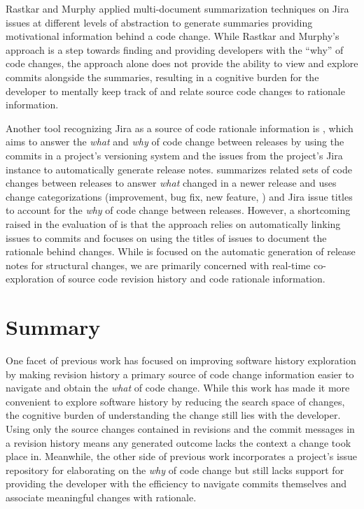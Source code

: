Rastkar and Murphy \cite{rastkar_why_2013} applied multi-document summarization techniques on Jira issues 
at different levels of abstraction to generate summaries providing motivational information behind a code change.
While Rastkar and Murphy's approach is a step towards finding and providing developers with the ``why'' of code changes, 
the approach alone does not provide the ability to view and explore commits alongside the summaries,
resulting in a cognitive burden for the developer to mentally 
keep track of and relate source code changes to rationale information.

Another tool recognizing Jira as a source of code rationale information is  \cite{moreno_arena_2017}, 
which aims to answer the \emph{what} and \emph{why} of code change between releases by 
using the commits in a project's versioning system and the issues from the project's Jira instance 
to automatically generate release notes. 
 summarizes related sets of code changes between releases to answer \emph{what} 
changed in a newer release and uses change categorizations (\eg improvement, bug fix, new feature, \etc) 
and Jira issue titles to account for the \emph{why} of code change between releases.
However, a shortcoming raised in the evaluation of  is that the approach 
relies on automatically linking issues to commits and focuses on 
using the titles of issues to document the rationale behind changes.
While  is focused on the automatic generation of release notes for structural changes,
we are primarily concerned with real-time co-exploration of source code revision history 
and code rationale information.


\section{Summary}

One facet of previous work has focused on improving software history exploration by making revision history 
a primary source of code change information easier to navigate and obtain the \emph{what} of code change.
While this work has made it more convenient to explore software history by reducing the search space of changes, 
the cognitive burden of understanding the change still lies with the developer.
Using only the source changes contained in revisions and the commit messages in a revision history 
means any generated outcome lacks the context a change took place in.
Meanwhile, the other side of previous work incorporates a project's issue repository for elaborating 
on the \emph{why} of code change but still lacks support for providing the developer with the efficiency to 
navigate commits themselves and associate meaningful changes with rationale.

